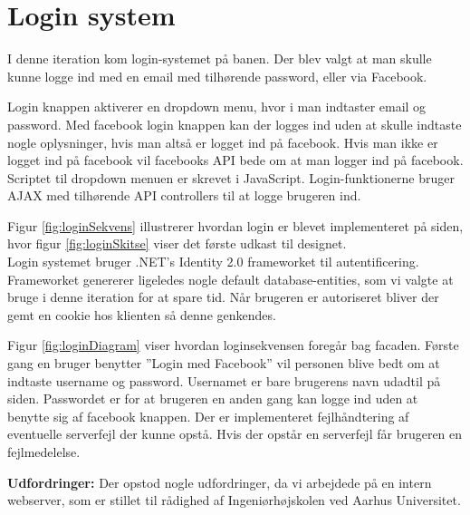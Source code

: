 \section{Login system}

I denne iteration kom login-systemet på banen. Der blev valgt at man skulle kunne logge ind med en email med tilhørende password, eller via Facebook.


Login knappen aktiverer en dropdown menu, hvor i man indtaster email og password. Med facebook login knappen kan der logges ind uden at skulle indtaste nogle oplysninger, hvis man altså er logget ind på facebook. Hvis man ikke er logget ind på facebook vil facebooks API bede om at man logger ind på facebook. Scriptet til dropdown menuen er skrevet i JavaScript. Login-funktionerne bruger AJAX med tilhørende API controllers til at logge brugeren ind.


Figur \ref{fig:loginSekvens} illustrerer hvordan login er blevet implementeret på siden, hvor figur \ref{fig:loginSkitse} viser det første udkast til designet. \\

Login systemet bruger .NET's Identity 2.0 frameworket til autentificering. Frameworket genererer ligeledes nogle default database-entities, som vi valgte at bruge i denne iteration for at spare tid. Når brugeren er autoriseret bliver der gemt en cookie hos klienten så denne genkendes.



Figur \ref{fig:loginDiagram} viser hvordan loginsekvensen foregår bag facaden. Første gang en bruger benytter ''Login med Facebook'' vil personen blive bedt om at indtaste username og password. Usernamet er bare brugerens navn udadtil på siden. Passwordet er for at brugeren en anden gang kan logge ind uden at benytte sig af facebook knappen. Der er implementeret fejlhåndtering af eventuelle serverfejl der kunne opstå. Hvis der opstår en serverfejl får brugeren en fejlmedelelse.

\textbf{Udfordringer:} 
Der opstod nogle udfordringer, da vi arbejdede på en intern webserver, som er stillet til rådighed af Ingeniørhøjskolen ved Aarhus Universitet. 

